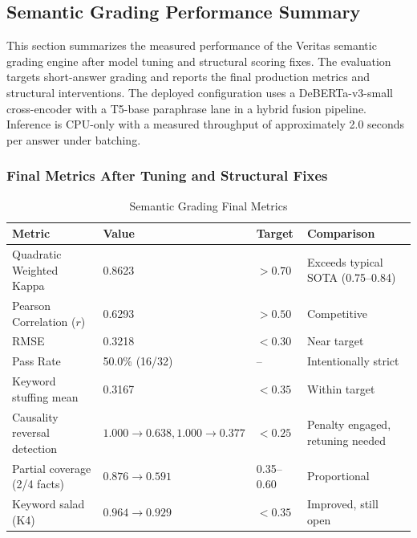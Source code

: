 \subsection{Semantic Grading Performance Summary}
This section summarizes the measured performance of the Veritas semantic grading engine after model tuning and structural scoring fixes. The evaluation targets short-answer grading and reports the final production metrics and structural interventions. The deployed configuration uses a DeBERTa-v3-small cross-encoder with a T5-base paraphrase lane in a hybrid fusion pipeline. Inference is CPU-only with a measured throughput of approximately 2.0 seconds per answer under batching.

\subsubsection{Final Metrics After Tuning and Structural Fixes}
\renewcommand{\arraystretch}{1.15}
\setlength{\tabcolsep}{4pt}
\begin{table}[H]
\centering
\caption{Semantic Grading Final Metrics}
\label{tab:grading-final-metrics}
\begin{tabular}{|p{4.1cm}|p{2.3cm}|p{2.4cm}|p{3.2cm}|}
\hline
\textbf{Metric} & \textbf{Value} & \textbf{Target} & \textbf{Comparison} \\ \hline
Quadratic Weighted Kappa & 0.8623 & $>0.70$ & Exceeds typical SOTA (0.75--0.84) \\ \hline
Pearson Correlation ($r$) & 0.6293 & $>0.50$ & Competitive \\ \hline
RMSE & 0.3218 & $<0.30$ & Near target \\ \hline
Pass Rate & 50.0\% (16/32) & -- & Intentionally strict \\ \hline
Keyword stuffing mean & 0.3167 & $<0.35$ & Within target \\ \hline
Causality reversal detection & $1.000 \rightarrow 0.638, 1.000 \rightarrow 0.377$ & $<0.25$ & Penalty engaged, retuning needed \\ \hline
Partial coverage (2/4 facts) & $0.876 \rightarrow 0.591$ & 0.35--0.60 & Proportional \\ \hline
Keyword salad (K4) & $0.964 \rightarrow 0.929$ & $<0.35$ & Improved, still open \\ \hline
\end{tabular}
\end{table}

